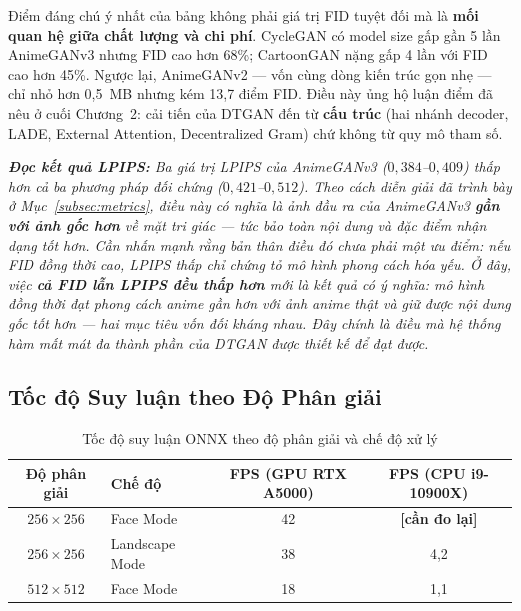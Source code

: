 Điểm đáng chú ý nhất của bảng không phải giá trị FID tuyệt đối mà là \textbf{mối quan hệ giữa chất lượng và chi phí}. CycleGAN có model size gấp gần 5 lần AnimeGANv3 nhưng FID cao hơn 68\%; CartoonGAN nặng gấp 4 lần với FID cao hơn 45\%. Ngược lại, AnimeGANv2 --- vốn cùng dòng kiến trúc gọn nhẹ --- chỉ nhỏ hơn 0,5~MB nhưng kém 13,7 điểm FID. Điều này ủng hộ luận điểm đã nêu ở cuối Chương~2: cải tiến của DTGAN đến từ \textbf{cấu trúc} (hai nhánh decoder, LADE, External Attention, Decentralized Gram) chứ không từ quy mô tham số.

\medskip
\noindent\textit{\textbf{Đọc kết quả LPIPS:} Ba giá trị LPIPS của AnimeGANv3 ($0{,}384$--$0{,}409$) thấp hơn cả ba phương pháp đối chứng ($0{,}421$--$0{,}512$). Theo cách diễn giải đã trình bày ở Mục~\ref{subsec:metrics}, điều này có nghĩa là ảnh đầu ra của AnimeGANv3 \textbf{gần với ảnh gốc hơn} về mặt tri giác --- tức bảo toàn nội dung và đặc điểm nhận dạng tốt hơn. Cần nhấn mạnh rằng bản thân điều đó chưa phải một ưu điểm: nếu FID đồng thời cao, LPIPS thấp chỉ chứng tỏ mô hình phong cách hóa yếu. Ở đây, việc \textbf{cả FID lẫn LPIPS đều thấp hơn} mới là kết quả có ý nghĩa: mô hình đồng thời đạt phong cách anime gần hơn với ảnh anime thật \textit{và} giữ được nội dung gốc tốt hơn --- hai mục tiêu vốn đối kháng nhau. Đây chính là điều mà hệ thống hàm mất mát đa thành phần của DTGAN được thiết kế để đạt được.}

\subsection{Tốc độ Suy luận theo Độ Phân giải}
\label{subsec:inference_speed}

\begin{table}[H]
\caption{Tốc độ suy luận ONNX theo độ phân giải và chế độ xử lý}
\label{tab:inference_speed}
\centering
\begin{tabular}{|c|l|c|c|}
\hline
\textbf{Độ phân giải} & \textbf{Chế độ} & \textbf{FPS (GPU RTX A5000)} & \textbf{FPS (CPU i9-10900X)} \\
\hline
$256 \times 256$ & Face Mode & 42 & \textbf{[cần đo lại]} \\
\hline
$256 \times 256$ & Landscape Mode & 38 & 4,2 \\
\hline
$512 \times 512$ & Face Mode & 18 & 1,1 \\
\hline
\end{tabular}
\end{table}


